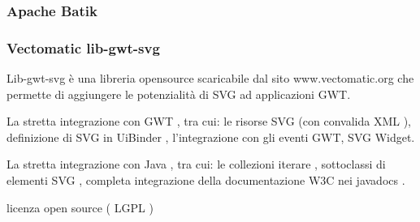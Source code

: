 \subsubsection*{Apache Batik}
\subsubsection*{Vectomatic lib-gwt-svg}
Lib-gwt-svg \`e una libreria opensource scaricabile dal sito www.vectomatic.org che permette di aggiungere le potenzialit\`a di SVG ad applicazioni GWT.

La stretta integrazione con GWT , tra cui: le risorse SVG (con convalida XML ), definizione di SVG in UiBinder , l'integrazione con gli eventi GWT, SVG Widget.

La stretta integrazione con Java , tra cui: le collezioni iterare , sottoclassi di elementi SVG , completa integrazione della documentazione W3C nei javadocs .

 licenza open source ( LGPL )